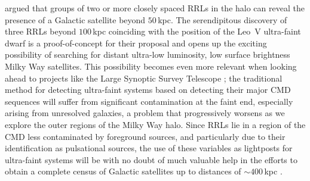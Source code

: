 \documentclass[iop]{emulateapj}
\begin{document}
\citet{Baker2015} argued that groups of two or more closely spaced RRLs in the halo can reveal the presence of a Galactic satellite beyond $50$\,kpc. 
The serendipitous discovery of three RRLs beyond $100$\,kpc coinciding with the position of the Leo~V ultra-faint dwarf is a proof-of-concept for their proposal and opens up the exciting possibility of searching for distant ultra-low luminosity, low surface brightness Milky Way satellites. 
This possibility becomes even more relevant when looking ahead to projects like the Large Synoptic Survey Telescope \citep[LSST;][]{LSST2009}; the traditional method for detecting ultra-faint systems based on detecting their major CMD sequences will suffer from significant contamination at the faint end, especially arising from unresolved galaxies, a problem that progressively worsens as we explore the outer regions of the Milky Way halo.
Since RRLs lie in a region of the CMD less contaminated by foreground sources, and particularly due to their identification as pulsational sources, the use of these variables as lightposts for ultra-faint systems will be with no doubt of much valuable help in the efforts to obtain a complete census of  Galactic satellites up to distances of $\sim 400$\,kpc \citep{ivezic08, Oluseyi2012}.
\end{document}
